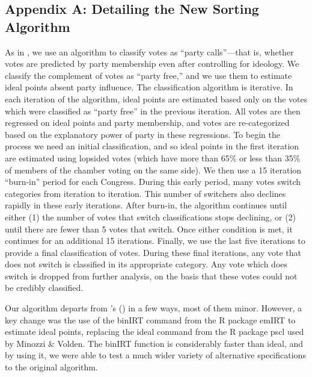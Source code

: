 \documentclass[12pt]{article}
\def\citeapos#1{\citeauthor{#1}'s (\citeyear{#1})} %
\begin{document}
\renewcommand\thetable{A\arabic{table}}
\renewcommand\thepage{A\arabic{page}}

\clearpage

\subsection*{Appendix A: Detailing the New Sorting Algorithm}
%

As in \citep{Minozzi:2013}, we use an algorithm to classify votes as ``party calls''---that is, whether votes are predicted by party membership even after controlling for ideology.  We classify the complement of votes as ``party free,'' and we use them to estimate ideal points absent party influence.  The classification algorithm is iterative.  In each iteration of the algorithm, ideal points are estimated based only on the votes which were classified as ``party free'' in the previous iteration.  All votes are then regressed on ideal points and party membership, and votes are re-categorized based on the explanatory power of party in these regressions.  To begin the process we need an initial classification, and so ideal points in the first iteration are estimated using lopsided votes (which have more than 65\% or less than 35\% of members of the chamber voting on the same side).  We then use a 15 iteration ``burn-in'' period for each Congress.  During this early period, many votes switch categories from iteration to iteration.  This number of switchers also declines rapidly in these early iterations.  After burn-in, the algorithm continues until either (1) the number of votes that switch classifications stops declining, or (2) until there are fewer than 5 votes that switch.  Once either condition is met, it continues for an additional 15 iterations.  Finally, we use the last five iterations to provide a final classification of votes. During these final iterations, any vote that does not switch is classified in its appropriate category.  Any vote which does switch is dropped from further analysis, on the basis that these votes could not be credibly classified.

Our algorithm departs from \citeapos{Minozzi:2013} in a few ways, most of them minor.  However, a key change was the use of the \textsf{binIRT} command from the \textsf{R} package \textsf{emIRT} \citep{Imai:2016} to estimate ideal points, replacing the \textsf{ideal} command from the \textsf{R} package \textsf{pscl} \citep{Jackman:2015} used by Minozzi \& Volden.  The \textsf{binIRT} function is considerably faster than \textsf{ideal}, and by using it, we were able to test a much wider variety of alternative specifications to the original algorithm.
\end{document}
